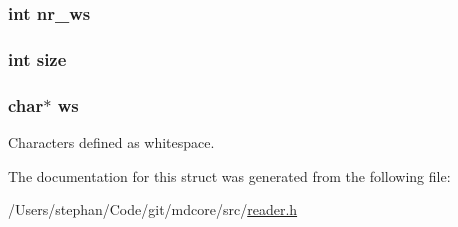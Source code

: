 \hypertarget{structreader_a9cc374c220e8585d7e5470f1b48279a6}{
\subsubsection[{nr\-\_\-ws}]{\setlength{\rightskip}{0pt plus 5cm}int nr\-\_\-ws}}\label{structreader_a9cc374c220e8585d7e5470f1b48279a6}
\hypertarget{structreader_a439227feff9d7f55384e8780cfc2eb82}{
\subsubsection[{size}]{\setlength{\rightskip}{0pt plus 5cm}int size}}\label{structreader_a439227feff9d7f55384e8780cfc2eb82}
\hypertarget{structreader_a13ac982f10e04f30e71bee5775f0daf4}{
\subsubsection[{ws}]{\setlength{\rightskip}{0pt plus 5cm}char$\ast$ ws}}\label{structreader_a13ac982f10e04f30e71bee5775f0daf4}
Characters defined as whitespace. 

The documentation for this struct was generated from the following file\-:\begin{DoxyCompactItemize}
\item 
/\-Users/stephan/\-Code/git/mdcore/src/\hyperlink{reader_8h}{reader.\-h}\end{DoxyCompactItemize}
